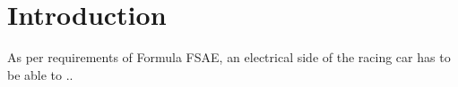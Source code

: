 \section{Introduction} \label{sec:Introduction}
As per requirements of Formula FSAE, an electrical side of the racing car has to be able to ..